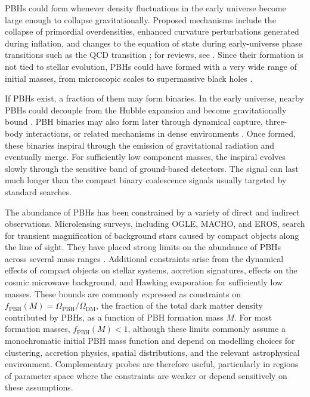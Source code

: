 \documentclass[aps,prd,amsmath,floats,floatfix, twocolumn,
superscriptaddress,nofootinbib,showpacs]{revtex4-2}
\newcommand{\red}{\textcolor{red}}
\begin{document}
PBHs could form whenever density fluctuations in the early universe become large enough to collapse gravitationally.  Proposed mechanisms include the collapse of primordial overdensities, enhanced curvature perturbations generated during inflation, and changes to the equation of state during early-universe phase transitions such as the QCD transition \cite{Carr:1975qj, Escriva:2019phb, Carr:1993aq, Kannike:2017bxn, Crawford:1982yz, Carr:2019hud}; for reviews, see \cite{Escriva:2022duf, Carr:2020xqk}.  Since their formation is not tied to stellar evolution, PBHs could have formed with a very wide range of initial masses, from microscopic scales to supermassive black holes \cite{Carr:2023tpt}. 

If PBHs exist, a fraction of them may form binaries.  In the early universe, nearby PBHs could decouple from the Hubble expansion and become gravitationally bound \cite{Nakamura:1997sm, Raidal:2018bbj}.  PBH binaries may also form later through dynamical capture, three-body interactions, or related mechanisms in dense environments \cite{Nishikawa:2017chy, Lehmann:2022vdt, Franciolini:2022ewd, Kritos:2020wcl}.  Once formed, these binaries inspiral through the emission of gravitational radiation and eventually merge.  For sufficiently low component masses, the inspiral evolves slowly through the sensitive band of ground-based detectors.  The signal can last much longer than the compact binary coalescence signals usually targeted by standard searches.

The abundance of PBHs has been constrained by a variety of direct and indirect observations.  Microlensing surveys, including OGLE, MACHO, and EROS, search for transient magnification of background stars caused by compact objects along the line of sight.  They have placed strong limits on the abundance of PBHs across several mass ranges \cite{MACHO:1998qtf, Wilkinson:2001vv}.  Additional constraints arise from the dynamical effects of compact objects on stellar systems, accretion signatures, effects on the cosmic microwave background, and Hawking evaporation for sufficiently low masses.  These bounds are commonly expressed as constraints on $f_\mathrm{PBH}(M) = \Omega_\mathrm{PBH}/\Omega_\mathrm{DM}$, the fraction of the total dark matter density contributed by PBHs, as a function of PBH formation mass $M$.  For most formation masses, $f_\mathrm{PBH}(M) < 1$, although these limits commonly assume a monochromatic initial PBH mass function and depend on modelling choices for clustering, accretion physics, spatial distributions, and the relevant astrophysical environment.  Complementary probes are therefore useful, particularly in regions of parameter space where the constraints are weaker or depend sensitively on these assumptions.
\end{document}
